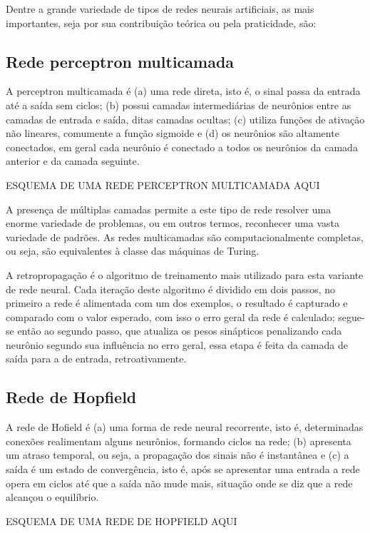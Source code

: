 Dentre a grande variedade de tipos de redes neurais artificiais, as mais
importantes, seja por sua contribuição teórica ou pela praticidade, são:

\subsection{Rede perceptron multicamada}

A perceptron multicamada é (a) uma rede direta, isto é, o sinal passa da entrada
até a saída sem ciclos; (b) possui camadas intermediárias de neurônios entre as
camadas de entrada e saída, ditas camadas ocultas; (c) utiliza funções de
ativação não lineares, comumente a função sigmoide e (d) os neurônios são
altamente conectados, em geral cada neurônio é conectado a todos os neurônios
da camada anterior e da camada seguinte.

ESQUEMA DE UMA REDE PERCEPTRON MULTICAMADA AQUI

A presença de múltiplas camadas permite a este tipo de rede resolver uma enorme
variedade de problemas, ou em outros termos, reconhecer uma vasta variedade de
padrões. As redes multicamadas são computacionalmente completas, ou seja, são
equivalentes à classe das máquinas de Turing.

A retropropagação é o algoritmo de treinamento mais utilizado para esta variante
de rede neural. Cada iteração deste algoritmo é dividido em dois passos, no
primeiro a rede é alimentada com um dos exemplos, o resultado é capturado e
comparado com o valor esperado, com isso o erro geral da rede é calculado;
segue-se então ao segundo passo, que atualiza os pesos sinápticos penalizando
cada neurônio segundo sua influência no erro geral, essa etapa é feita da camada
de saída para a de entrada, retroativamente.

\subsection{Rede de Hopfield}

A rede de Hofield é (a) uma forma de rede neural recorrente, isto é,
determinadas conexões realimentam alguns neurônios, formando ciclos na rede; (b)
apresenta um atraso temporal, ou seja, a propagação dos sinais não é instantânea
e (c) a saída é um estado de convergência, isto é, após se apresentar uma entrada
a rede opera em ciclos até que a saída não mude mais, situação onde se diz que a
rede alcançou o equilíbrio.

ESQUEMA DE UMA REDE DE HOPFIELD AQUI

